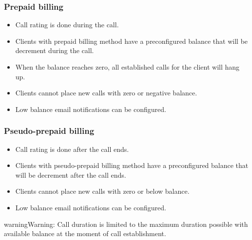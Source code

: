 \documentclass[letterpaper,10pt,english]{sphinxmanual}
\begin{document}
\subsubsection{Prepaid billing}
\label{administration_portal/brand/billing/index:prepaid-billing}\label{administration_portal/brand/billing/index:id3}\begin{itemize}
\item {} 
Call rating is done during the call.

\item {} 
Clients with prepaid billing method have a preconfigured balance that will be decrement during the call.

\item {} 
When the balance reaches zero, all established calls for the client will hang up.

\item {} 
Clients cannot place new calls with zero or negative balance.

\item {} 
Low balance email notifications can be configured.

\end{itemize}


\subsubsection{Pseudo-prepaid billing}
\label{administration_portal/brand/billing/index:id4}\label{administration_portal/brand/billing/index:pseudo-prepaid-billing}\begin{itemize}
\item {} 
Call rating is done after the call ends.

\item {} 
Clients with pseudo-prepaid billing method have a preconfigured balance that will be decrement after the call ends.

\item {} 
Clients cannot place new calls with zero or below balance.

\item {} 
Low balance email notifications can be configured.

\end{itemize}

\begin{notice}{warning}{Warning:}
Call duration is limited to the maximum duration possible with available balance at the moment of call establishment.
\end{notice}
\end{document}

